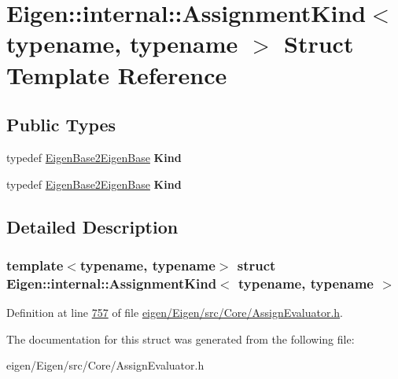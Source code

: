 \hypertarget{struct_eigen_1_1internal_1_1_assignment_kind}{}\section{Eigen\+:\+:internal\+:\+:Assignment\+Kind$<$ typename, typename $>$ Struct Template Reference}
\label{struct_eigen_1_1internal_1_1_assignment_kind}
\subsection*{Public Types}
\begin{DoxyCompactItemize}
\item 
\mbox{\label{struct_eigen_1_1internal_1_1_assignment_kind_a18fda331c81a14c0764198df6851d6d1}} 
typedef \hyperlink{struct_eigen_1_1internal_1_1_eigen_base2_eigen_base}{Eigen\+Base2\+Eigen\+Base} {\bfseries Kind}
\item 
\mbox{\label{struct_eigen_1_1internal_1_1_assignment_kind_a18fda331c81a14c0764198df6851d6d1}} 
typedef \hyperlink{struct_eigen_1_1internal_1_1_eigen_base2_eigen_base}{Eigen\+Base2\+Eigen\+Base} {\bfseries Kind}
\end{DoxyCompactItemize}


\subsection{Detailed Description}
\subsubsection*{template$<$typename, typename$>$\newline
struct Eigen\+::internal\+::\+Assignment\+Kind$<$ typename, typename $>$}



Definition at line \hyperlink{eigen_2_eigen_2src_2_core_2_assign_evaluator_8h_source_l00757}{757} of file \hyperlink{eigen_2_eigen_2src_2_core_2_assign_evaluator_8h_source}{eigen/\+Eigen/src/\+Core/\+Assign\+Evaluator.\+h}.



The documentation for this struct was generated from the following file\+:\begin{DoxyCompactItemize}
\item 
eigen/\+Eigen/src/\+Core/\+Assign\+Evaluator.\+h\end{DoxyCompactItemize}
